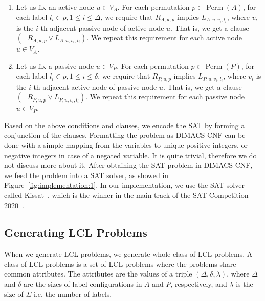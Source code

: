 \begin{enumerate}
\begin{enumerate}
  \item
    Let us fix an active node $u \in V_A$.
    For each permutation $p \in \operatorname{Perm}(A)$, for each label $l_i \in p, 1 \leq i \leq \Delta$, we require that $R_{A, u, p}$ implies $L_{A,u,v_i,l_i}$, where $v_i$ is the $i$-th adjacent passive node of active node $u$.
    That is, we get a clause $(\neg R_{A, u, p} \lor L_{A,u,v_i,l_i})$.
    We repeat this requirement for each active node $u \in V_A$.
    \label{enu:sat_conditions:3a}
  \item
    Let us fix a passive node $u \in V_P$.
    For each permutation $p \in \operatorname{Perm}(P)$, for each label $l_i \in p, 1 \leq i \leq \delta$, we require that $R_{P, u, p}$ implies $L_{P,u,v_i,l_i}$, where $v_i$ is the $i$-th adjacent active node of passive node $u$.
    That is, we get a clause $(\neg R_{P, u, p} \lor L_{P,u,v_i,l_i})$.
    We repeat this requirement for each passive node $u \in V_P$.
    \label{enu:sat_conditions:3b}
  \end{enumerate}
\end{enumerate}

Based on the above conditions and clauses, we encode the SAT by forming a conjunction of the clauses.
Formatting the problem as DIMACS CNF can be done with a simple mapping from the variables to unique positive integers, or negative integers in case of a negated variable.
It is quite trivial, therefore we do not discuss more about it.
After obtaining the SAT problem in DIMACS CNF, we feed the problem into a SAT solver, as showed in Figure~\ref{fig:implementation:1}.
In our implementation, we use the SAT solver called Kissat~\cite{BiereFazekasFleuryHeisinger-SAT-Competition-2020-solvers, Kissat}, which is the winner in the main track of the SAT Competition 2020~\cite{SatCompetition2020}.


\subsection{Generating LCL Problems} \label{sec:implementation:generating_lcl_problems}

When we generate LCL problems, we generate whole class of LCL problems.
A class of LCL problems is a set of LCL problems where the problems share common attributes.
The attributes are the values of a triple $(\Delta, \delta, \lambda)$, where $\Delta$ and $\delta$ are the sizes of label configurations in $A$ and $P$, respectively, and $\lambda$ is the size of $\Sigma$ i.e. the number of labels.

